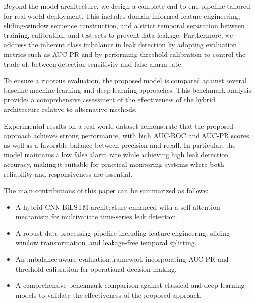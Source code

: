 Beyond the model architecture, we design a complete end-to-end pipeline tailored for real-world deployment. This includes domain-informed feature engineering, sliding-window sequence construction, and a strict temporal separation between training, calibration, and test sets to prevent data leakage. Furthermore, we address the inherent class imbalance in leak detection by adopting evaluation metrics such as AUC-PR and by performing threshold calibration to control the trade-off between detection sensitivity and false alarm rate.

To ensure a rigorous evaluation, the proposed model is compared against several baseline machine learning and deep learning approaches. This benchmark analysis provides a comprehensive assessment of the effectiveness of the hybrid architecture relative to alternative methods.

Experimental results on a real-world dataset demonstrate that the proposed approach achieves strong performance, with high AUC-ROC and AUC-PR scores, as well as a favorable balance between precision and recall. In particular, the model maintains a low false alarm rate while achieving high leak detection accuracy, making it suitable for practical monitoring systems where both reliability and responsiveness are essential.

The main contributions of this paper can be summarized as follows:
\begin{itemize}
    \item A hybrid CNN-BiLSTM architecture enhanced with a self-attention mechanism for multivariate time-series leak detection.
    \item A robust data processing pipeline including feature engineering, sliding-window transformation, and leakage-free temporal splitting.
    \item An imbalance-aware evaluation framework incorporating AUC-PR and threshold calibration for operational decision-making.
    \item A comprehensive benchmark comparison against classical and deep learning models to validate the effectiveness of the proposed approach.
\end{itemize}